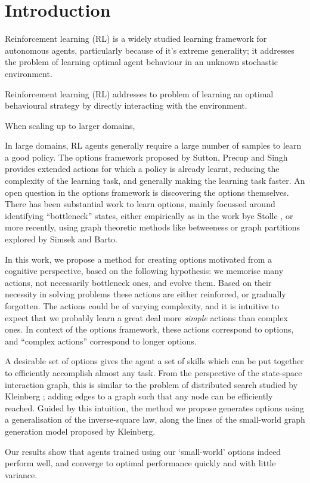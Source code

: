 \section{Introduction}
\label{sec:intro}

Reinforcement learning (RL) is a widely studied learning framework for
autonomous agents, particularly because of it's extreme generality; it
addresses the problem of learning optimal agent behaviour in an unknown
stochastic environment.

Reinforcement learning (RL) addresses to problem of learning an optimal
behavioural strategy by directly interacting with the environment. 

When scaling up to larger domains, 




In large domains, RL agents generally require a large number of samples to learn
a good policy. The options framework proposed by Sutton, Precup and Singh
\cite{SuttonPrecupSingh1998} provides extended actions for which a policy is
already learnt, reducing the complexity of the learning task, and generally
making the learning task faster. An open question in the options framework is
discovering the options themselves. There has been substantial work to learn
options, mainly focussed around identifying ``bottleneck'' states, either
empirically as in the work bye Stolle \cite{Stolle}, or more recently, using
graph theoretic methods like betweeness \cite{Simsek} or graph partitions
\cite{Simsek2005} explored by Simsek and Barto.

In this work, we propose a method for creating options motivated from a
cognitive perspective, based on the following hypothesis: we memorise many
actions, not necessarily bottleneck ones, and evolve them. Based on their
necessity in solving problems these actions are either reinforced, or gradually
forgotten. The actions could be of varying complexity, and it is intuitive to
expect that we probably learn a great deal more {\em simple} actions than
complex ones. In context of the options framework, these actions correspond to
options, and ``complex actions'' correspond to longer options.

A desirable set of options gives the agent a set of skills which can be put
together to efficiently accomplish almost any task. From the perspective of the
state-space interaction graph, this is similar to the problem of distributed
search studied by Kleinberg \cite{Kleinberg}; adding edges to a graph such that
any node can be efficiently reached. Guided by this intuition, the method we
propose generates options using a generalisation of the inverse-square law,
along the lines of the small-world graph generation model proposed by Kleinberg.

Our results show that agents trained using our `small-world' options indeed
perform well, and converge to optimal performance quickly and with little
variance. 


